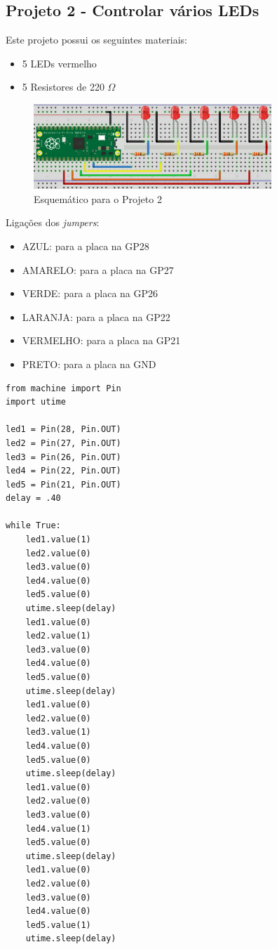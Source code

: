\documentclass[a4paper,11pt]{article}
\begin{document}
\subsection{Projeto 2 - Controlar vários LEDs}

Este projeto possui os seguintes materiais: \vspace{-1em}
\begin{itemize}
	\item 5 LEDs vermelho
	\item 5 Resistores de 220 $\Omega$
\end{itemize}

\begin{figure}[H]
	\centering
	\includegraphics[width=0.8\textwidth]{imagem/PicoProj2}
	\caption{Esquemático para o Projeto 2}
\end{figure}

Ligações dos \textit{jumpers}: \vspace{-1em}
\begin{itemize}
	\item AZUL: para a placa na GP28
	\item AMARELO: para a placa na GP27
	\item VERDE: para a placa na GP26
	\item LARANJA: para a placa na GP22
	\item VERMELHO: para a placa na GP21
	\item PRETO: para a placa na GND
\end{itemize}

\begin{lstlisting}
from machine import Pin
import utime

led1 = Pin(28, Pin.OUT)
led2 = Pin(27, Pin.OUT)
led3 = Pin(26, Pin.OUT)
led4 = Pin(22, Pin.OUT)
led5 = Pin(21, Pin.OUT)
delay = .40

while True:
	led1.value(1)
	led2.value(0)
	led3.value(0)
	led4.value(0)
	led5.value(0)
	utime.sleep(delay)
	led1.value(0)
	led2.value(1)
	led3.value(0)
	led4.value(0)
	led5.value(0)
	utime.sleep(delay)
	led1.value(0)
	led2.value(0)
	led3.value(1)
	led4.value(0)
	led5.value(0)
	utime.sleep(delay)
	led1.value(0)
	led2.value(0)
	led3.value(0)
	led4.value(1)
	led5.value(0)
	utime.sleep(delay)
	led1.value(0)
	led2.value(0)
	led3.value(0)
	led4.value(0)
	led5.value(1)
	utime.sleep(delay)
\end{lstlisting}
\end{document}
